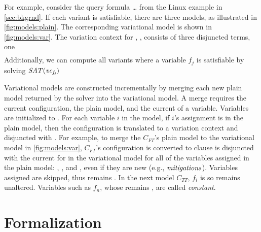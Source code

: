 For example, consider the query formula \ldots{} from the
Linux example in \autoref{sec:bkgrnd}.
If each variant is satisfiable, there are three models, as illustrated in
\autoref{fig:models:plain}. The corresponding variational model is shown in
\autoref{fig:models:var}.
The variation context for \SatVar{}, \Satfmf{}, consists of three
disjuncted terms, one
%
\begin{align*}
\end{align*}%
%
Additionally, we can compute all variants where a variable $f_j$ is
satisfiable by solving $\mathit{SAT(\mathit{vc}_{f_j})}$

Variational models are constructed incrementally by merging each new plain model
returned by the solver into the variational model. A merge requires the current
configuration, the plain model, and the current \vc{} of a variable. Variables are
initialized to \fls{}. For each variable $i$ in the model, if $i$'s assignment
is \tru{} in the plain model, then the configuration is translated to a
variation context and disjuncted with . For example, to merge the
$C_{FT}$'s plain model to the variational model in \autoref{fig:models:var},
$C_{FT}$'s configuration is converted to %
clause is disjuncted with the current \vc{} for in the variational model
for all of the variables assigned \tru{} in the plain model: ,
, and , even if they are new (e.g.,
$\mathit{mitigations}$). Variables assigned \fls{} are skipped, thus  remains
\fls{}. In the next model $C_{TT}$, $f_{i}$ is \fls{} so  remains
unaltered. Variables such as $f_{n}$, whose \vc{} remains \fls{}, are called
\textit{constant}.

\section{Formalization}


